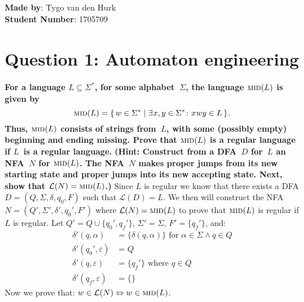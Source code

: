 \documentclass[a4paper]{article}
\newcommand{\Mid}{\textsc{mid}}
\newcommand{\calL}{\mathcal{L}}
\newcommand{\eps}{\varepsilon}
\begin{document}
    \textbf{Made by}: Tygo van den Hurk \\
    \textbf{Student Number}: 1705709 \\
    \section*{Question 1: Automaton engineering}
        \textbf{For a language $L \subseteq \Sigma^\ast$, for some alphabet~$\Sigma$, the language $\Mid(L)$ is given by}
        \begin{displaymath}
          \Mid(L) =
          \lbrace \, w \in \Sigma^\ast \mid
          \exists \mkern1mu x,y \in \Sigma^\ast \colon
          x \mkern0.5mu wy \in L
          \, \rbrace \mkern1mu .
        \end{displaymath}
        \textbf{Thus, $\Mid(L)$ consists of strings from~$L$, with some (possibly empty) beginning and ending missing. Prove that $\Mid(L)$ is a regular language if $L$~is a regular language.}
        \medskip
        \textbf{(Hint: Construct from a DFA~$D$ for~$L$ an NFA~$N$ for $\Mid(L)$. The NFA~$N$ makes proper jumps from its new starting state and proper jumps into its new accepting state. Next, show that $\calL(N) = \Mid(L)$.)}
            \bigskip
            Since $L$ is regular we know that there exists a DFA $D = (Q, \Sigma, \delta, q_0, F)$ such that $\mathcal{L}(D)=L$. We then will construct the NFA $N = (Q', \Sigma', \delta', q_0', F')$ where $\mathcal{L}(N) = \Mid(L)$ to prove that $\Mid(L)$ is regular if $L$ is regular.
            \bigskip
            Let $Q' = Q \cup \{ q_0', q_f' \}$, $\Sigma' = \Sigma$, $F' = \{ q_f' \}$, and:
            \begin{align}
                   \delta'(q, \alpha) &= \{ \delta(q, \alpha) \} \text{ for } \alpha\in\Sigma \wedge q \in Q
                \\ \delta'(q_0', \eps) &= Q 
                \\ \delta'(q, \eps) &= \{ q_f' \} \text{ where }q \in Q
                \\ \delta'(q_f, \eps) &= \{ \}
            \end{align}
            Now we prove that: $w\in\mathcal{L}(N) \Leftrightarrow w\in\Mid(L)$.
\end{document}
